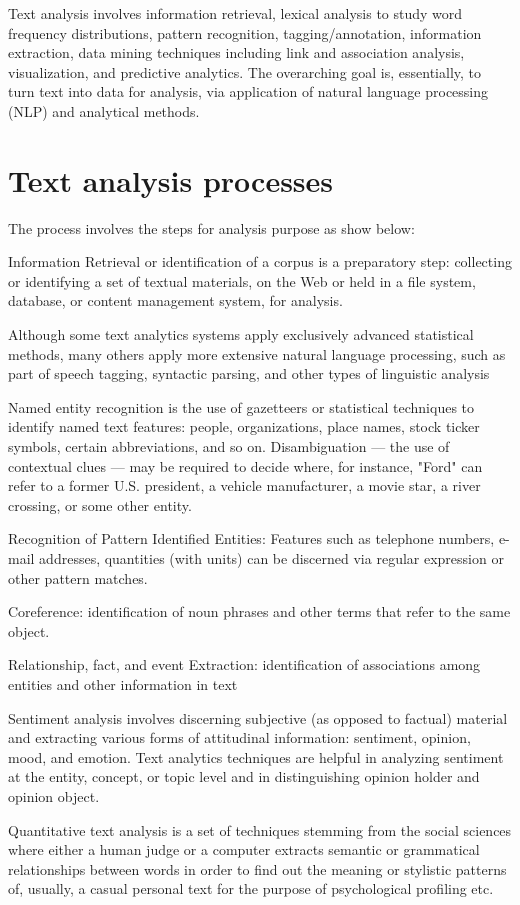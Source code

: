\documentclass[12pt]{book}
\begin{document}
Text analysis involves information retrieval, lexical analysis to study word frequency distributions, pattern recognition, tagging/annotation, information extraction, data mining techniques including link and association analysis, visualization, and predictive analytics. The overarching goal is, essentially, to turn text into data for analysis, via application of natural language processing (NLP) and analytical methods.

\section{Text analysis processes}
The process involves the steps for analysis purpose as show below\cite{wikipedia-textmining}:
\begin{itemize*}
  \item Information Retrieval or identification of a corpus is a preparatory step: collecting or identifying a set of textual materials, on the Web or held in a file system, database, or content management system, for analysis. 
  \item Although some text analytics systems apply exclusively advanced statistical methods, many others apply more extensive natural language processing, such as part of speech tagging, syntactic parsing, and other types of linguistic analysis
  \item Named entity recognition is the use of gazetteers or statistical techniques to identify named text features: people, organizations, place names, stock ticker symbols, certain abbreviations, and so on. Disambiguation — the use of contextual clues — may be required to decide where, for instance, "Ford" can refer to a former U.S. president, a vehicle manufacturer, a movie star, a river crossing, or some other entity.
  \item Recognition of Pattern Identified Entities: Features such as telephone numbers, e-mail addresses, quantities (with units) can be discerned via regular expression or other pattern matches.
  \item Coreference: identification of noun phrases and other terms that refer to the same object.
  \item Relationship, fact, and event Extraction: identification of associations among entities and other information in text
  \item Sentiment analysis involves discerning subjective (as opposed to factual) material and extracting various forms of attitudinal information: sentiment, opinion, mood, and emotion. Text analytics techniques are helpful in analyzing sentiment at the entity, concept, or topic level and in distinguishing opinion holder and opinion object.
  \item Quantitative text analysis is a set of techniques stemming from the social sciences where either a human judge or a computer extracts semantic or grammatical relationships between words in order to find out the meaning or stylistic patterns of, usually, a casual personal text for the purpose of psychological profiling etc.
\end{itemize*}
\end{document}
